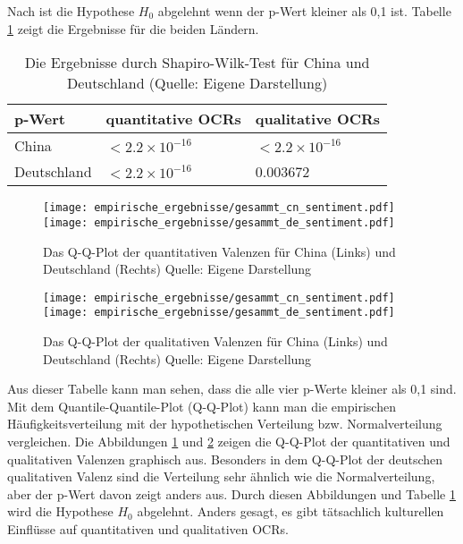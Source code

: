Nach \citet[p.~547]{patrick1995remark} ist die Hypothese $H_0$ abgelehnt wenn der p-Wert kleiner als 0,1 ist. Tabelle \ref{tab:h0_pwert} zeigt die Ergebnisse für die beiden Ländern. 
\begin{table}[htb]
\centering
\begin{tabular}{|l|l|l|}
\hline
p-Wert      & quantitative \ac{OCRs} & qualitative \ac{OCRs}  \\\hline
China       & $<2.2 \times 10^{-16}$ &  $<2.2 \times 10^{-16}$  \\\hline
Deutschland &  $<2.2 \times 10^{-16}$  & 0.003672        \\ \hline
\end{tabular}
\caption[Die Ergebnisse durch Shapiro-Wilk-Test für China und Deutschland]{Die Ergebnisse durch Shapiro-Wilk-Test für China und Deutschland (Quelle: Eigene Darstellung)}
\label{tab:h0_pwert}
\end{table}
\begin{figure}[htb]
    \texttt{[image: empirische\_ergebnisse/gesammt\_cn\_sentiment.pdf]}
    \endminipage\hfill
    \texttt{[image: empirische\_ergebnisse/gesammt\_de\_sentiment.pdf]}
    \endminipage        
\caption[Das Q-Q-Plot der quantitativen Valenzen für China und Deutschland]{Das Q-Q-Plot der quantitativen Valenzen für China (Links) und Deutschland (Rechts) Quelle: Eigene Darstellung}
\label{fig:qqplot_quantitativ}
\end{figure}
\begin{figure}[htb]
    \texttt{[image: empirische\_ergebnisse/gesammt\_cn\_sentiment.pdf]}
    \endminipage\hfill
    \texttt{[image: empirische\_ergebnisse/gesammt\_de\_sentiment.pdf]}
    \endminipage        
\caption[Das Q-Q-Plot der qualitativen Valenzen für China und Deutschland]{Das Q-Q-Plot der qualitativen Valenzen für China (Links) und Deutschland (Rechts) Quelle: Eigene Darstellung}
\label{fig:qqplot_qualitativ}
\end{figure}

Aus dieser Tabelle kann man sehen, dass die alle vier p-Werte kleiner als 0,1 sind. Mit dem Quantile-Quantile-Plot (Q-Q-Plot) kann man die empirischen Häufigkeitsverteilung mit der hypothetischen Verteilung \ac{bzw.} Normalverteilung vergleichen. Die Abbildungen \ref{fig:qqplot_quantitativ} und \ref{fig:qqplot_qualitativ} zeigen die Q-Q-Plot der quantitativen und qualitativen Valenzen graphisch aus. Besonders in dem Q-Q-Plot der deutschen qualitativen Valenz sind die Verteilung sehr ähnlich wie die Normalverteilung, aber der p-Wert davon zeigt anders aus. Durch diesen Abbildungen und Tabelle \ref{tab:h0_pwert} wird die Hypothese $H_0$ abgelehnt. Anders gesagt, es gibt tätsachlich kulturellen Einflüsse auf quantitativen und qualitativen \acl{OCRs}. 

